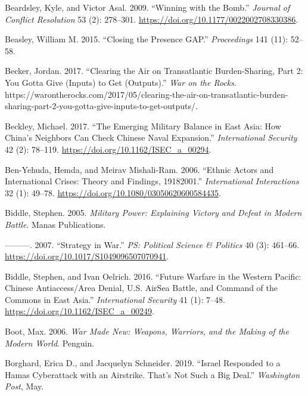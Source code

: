 \documentclass[
]{article}
\begin{document}
\leavevmode\hypertarget{ref-beardsley_winningbomb_2009}{}%
Beardsley, Kyle, and Victor Asal. 2009. ``Winning with the Bomb.'' \emph{Journal of Conflict Resolution} 53 (2): 278--301. \url{https://doi.org/10.1177/0022002708330386}.

\leavevmode\hypertarget{ref-beasley_closingpresencegap_2015}{}%
Beasley, William M. 2015. ``Closing the Presence GAP.'' \emph{Proceedings} 141 (11): 52--58.

\leavevmode\hypertarget{ref-becker_clearingairtransatlantic_2017}{}%
Becker, Jordan. 2017. ``Clearing the Air on Transatlantic Burden-Sharing, Part 2: You Gotta Give (Inputs) to Get (Outputs).'' \emph{War on the Rocks}. https://warontherocks.com/2017/05/clearing-the-air-on-transatlantic-burden-sharing-part-2-you-gotta-give-inputs-to-get-outputs/.

\leavevmode\hypertarget{ref-beckley_emergingmilitarybalance_2017}{}%
Beckley, Michael. 2017. ``The Emerging Military Balance in East Asia: How China's Neighbors Can Check Chinese Naval Expansion.'' \emph{International Security} 42 (2): 78--119. \url{https://doi.org/10.1162/ISEC_a_00294}.

\leavevmode\hypertarget{ref-ben-yehuda_ethnicactorsinternational_2006}{}%
Ben-Yehuda, Hemda, and Meirav Mishali-Ram. 2006. ``Ethnic Actors and International Crises: Theory and Findings, 19182001.'' \emph{International Interactions} 32 (1): 49--78. \url{https://doi.org/10.1080/03050620600584435}.

\leavevmode\hypertarget{ref-biddle_militarypowerexplaining_2005}{}%
Biddle, Stephen. 2005. \emph{Military Power: Explaining Victory and Defeat in Modern Battle}. Manas Publications.

\leavevmode\hypertarget{ref-biddle_strategywar_2007}{}%
---------. 2007. ``Strategy in War.'' \emph{PS: Political Science \& Politics} 40 (3): 461--66. \url{https://doi.org/10.1017/S1049096507070941}.

\leavevmode\hypertarget{ref-biddle_futurewarfarewestern_2016}{}%
Biddle, Stephen, and Ivan Oelrich. 2016. ``Future Warfare in the Western Pacific: Chinese Antiaccess/Area Denial, U.S. AirSea Battle, and Command of the Commons in East Asia.'' \emph{International Security} 41 (1): 7--48. \url{https://doi.org/10.1162/ISEC_a_00249}.

\leavevmode\hypertarget{ref-boot_warmadenew_2006}{}%
Boot, Max. 2006. \emph{War Made New: Weapons, Warriors, and the Making of the Modern World}. Penguin.

\leavevmode\hypertarget{ref-borghard_israelrespondedhamas_2019}{}%
Borghard, Erica D., and Jacquelyn Schneider. 2019. ``Israel Responded to a Hamas Cyberattack with an Airstrike. That's Not Such a Big Deal.'' \emph{Washington Post}, May.
\end{document}
